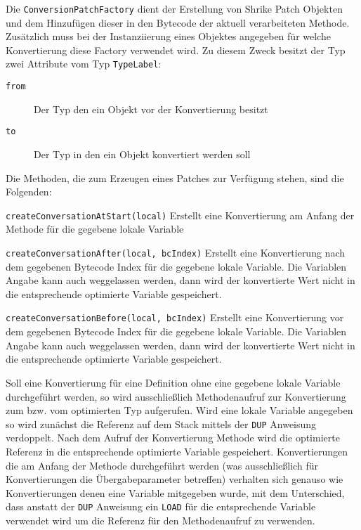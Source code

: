 Die \texttt{ConversionPatchFactory} dient der Erstellung von Shrike Patch Objekten und dem Hinzufügen dieser
in den Bytecode der aktuell verarbeiteten Methode. Zusätzlich muss bei der Instanziierung eines Objektes 
angegeben für welche Konvertierung diese Factory verwendet wird. Zu diesem Zweck besitzt der Typ zwei 
Attribute vom Typ \texttt{TypeLabel}:

\begin{description}
	\item[\texttt{from}] Der Typ den ein Objekt vor der Konvertierung besitzt
	\item[\texttt{to}] Der Typ in den ein Objekt konvertiert werden soll
\end{description}

Die Methoden, die zum Erzeugen eines Patches zur Verfügung stehen, sind die Folgenden:

\begin{description}
	\item{\texttt{createConversationAtStart(local)}} Erstellt eine Konvertierung am Anfang der Methode
	für die gegebene lokale Variable
	\item{\texttt{createConversationAfter(local, bcIndex)}} Erstellt eine Konvertierung nach dem gegebenen
	Bytecode Index für die gegebene lokale Variable. Die Variablen Angabe kann auch weggelassen werden, 
	dann wird der konvertierte Wert nicht in die entsprechende optimierte Variable gespeichert.
	\item{\texttt{createConversationBefore(local, bcIndex)}}  Erstellt eine Konvertierung vor dem gegebenen
	Bytecode Index für die gegebene lokale Variable. Die Variablen Angabe kann auch weggelassen werden, 
	dann wird der konvertierte Wert nicht in die entsprechende optimierte Variable gespeichert.
\end{description}

Soll eine Konvertierung für eine Definition ohne eine gegebene lokale Variable durchgeführt werden, so 
wird ausschließlich Methodenaufruf zur Konvertierung zum bzw. vom optimierten Typ aufgerufen. Wird eine 
lokale Variable angegeben so wird zunächst die Referenz auf dem Stack mittels der \texttt{DUP} Anweisung 
verdoppelt. Nach dem Aufruf der Konvertierung Methode wird die optimierte Referenz in die entsprechende 
optimierte Variable gespeichert. Konvertierungen die am Anfang der Methode durchgeführt werden (was 
ausschließlich für Konvertierungen die Übergabeparameter betreffen) verhalten sich genauso wie 
Konvertierungen denen eine Variable mitgegeben wurde, mit dem Unterschied, dass anstatt der \texttt{DUP} 
Anweisung ein \texttt{LOAD} für die entsprechende Variable verwendet wird um die Referenz für den 
Methodenaufruf zu verwenden.

